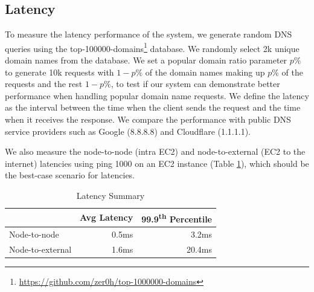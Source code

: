 \documentclass[format=sigconf,nonacm,screen]{acmart}
\begin{document}
\subsection{Latency}
To measure the latency performance of the system, we generate random DNS queries using the top-100000-domains\footnote{\url{https://github.com/zer0h/top-1000000-domains}} database. We randomly select 2k unique domain names from the database. We set a popular domain ratio parameter $p\%$ to generate 10k requests with $1-p\%$ of the domain names making up $p\%$ of the requests and the rest $1-p\%$, to test if our system can demonstrate better performance when handling popular domain name requests. We define the latency as the interval between the time when the client sends the request and the time when it receives the response. We compare the performance with public DNS service providers such as Google (8.8.8.8) and Cloudflare (1.1.1.1). 

We also measure the node-to-node (intra EC2) and node-to-external (EC2 to the internet) latencies using ping 1000 on an EC2 instance (Table \ref{tab:latency1}), which should be the best-case scenario for latencies.
\begin{table}[ht] \centering \small
\vspace*{-0.2\baselineskip}
\begin{tabular}{@{}lrr@{}} \toprule
 & Avg Latency & 99.9\textsuperscript{th} Percentile \\ \midrule
Node-to-node & 0.5ms & 3.2ms \\
Node-to-external & 1.6ms & 20.4ms \\
\bottomrule
\end{tabular}
\caption{Latency Summary}
\label{tab:latency1}
\vspace*{-\baselineskip}
\end{table}
\end{document}
